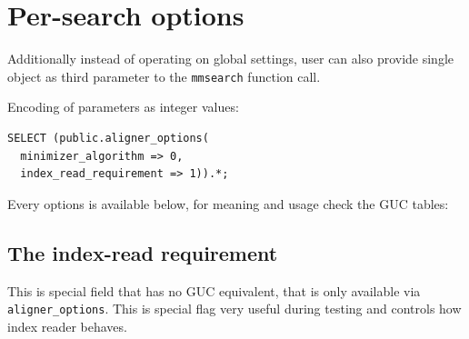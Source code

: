 \section{Per-search options}
\label{sec:appendix-search-options}
\label{sec:appendix-options-precedence}

Additionally instead of operating on global settings, user can also provide single object as third parameter to the \texttt{mmsearch} function call.


Encoding of parameters as integer values:
\begin{lstlisting}[style=bioseq-search-sql,
  caption={Passing options by 3rd argument of mmsearch},
  label={lst:configuration-options}]
SELECT (public.aligner_options(
  minimizer_algorithm => 0,
  index_read_requirement => 1)).*;
\end{lstlisting}

Every options is available below, for meaning and usage check the GUC tables:


\subsection{The index-read requirement}
\label{sec:appendix-options-index-policy}

This is special field that has no GUC equivalent, that is only available via \texttt{aligner\_options}. This is special flag very useful during testing and controls
how index reader behaves.

